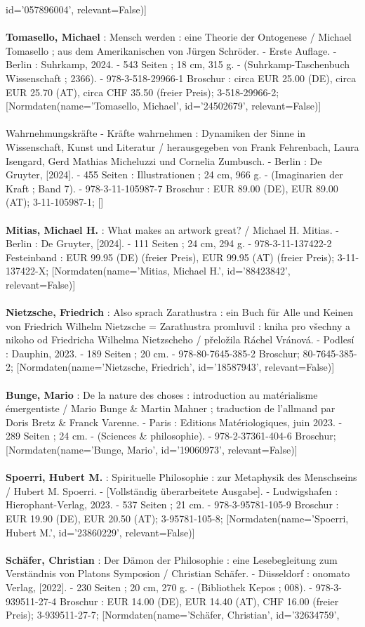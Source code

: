 \documentclass{article}
\begin{document}
\begin{multicols}{3}
id='057896004', relevant=False)]\\\\\textbf{Tomasello, Michael} : Mensch werden : eine Theorie der Ontogenese / Michael Tomasello ; aus dem Amerikanischen von Jürgen Schröder. - Erste Auflage. - Berlin : Suhrkamp, 2024. - 543 Seiten ; 18 cm, 315 g. - (Suhrkamp-Taschenbuch Wissenschaft ; 2366). - 978-3-518-29966-1 Broschur : circa EUR 25.00 (DE), circa EUR 25.70 (AT), circa CHF 35.50 (freier Preis); 3-518-29966-2; [Normdaten(name='Tomasello, Michael', id='24502679', relevant=False)]\\\\Wahrnehmungskräfte - Kräfte wahrnehmen : Dynamiken der Sinne in Wissenschaft, Kunst und Literatur / herausgegeben von Frank Fehrenbach, Laura Isengard, Gerd Mathias Micheluzzi und Cornelia Zumbusch. - Berlin : De Gruyter, [2024]. - 455 Seiten : Illustrationen ; 24 cm, 966 g. - (Imaginarien der Kraft ; Band 7). - 978-3-11-105987-7 Broschur : EUR 89.00 (DE), EUR 89.00 (AT); 3-11-105987-1; []\\\\\textbf{Mitias, Michael H.} : What makes an artwork great? / Michael H. Mitias. - Berlin : De Gruyter, [2024]. - 111 Seiten ; 24 cm, 294 g. - 978-3-11-137422-2 Festeinband : EUR 99.95 (DE) (freier Preis), EUR 99.95 (AT) (freier Preis); 3-11-137422-X; [Normdaten(name='Mitias, Michael H.', id='88423842', relevant=False)]\\\\\textbf{Nietzsche, Friedrich} : Also sprach Zarathustra : ein Buch für Alle und Keinen von Friedrich Wilhelm Nietzsche = Zarathustra promluvil : kniha pro všechny a nikoho od Friedricha Wilhelma Nietzscheho / přeložila Ráchel Vránová. - Podlesí : Dauphin, 2023. - 189 Seiten ; 20 cm. - 978-80-7645-385-2 Broschur; 80-7645-385-2; [Normdaten(name='Nietzsche, Friedrich', id='18587943', relevant=False)]\\\\\textbf{Bunge, Mario} : De la nature des choses : introduction au matérialisme émergentiste / Mario Bunge \& Martin Mahner ; traduction de l'allmand par Doris Bretz \& Franck Varenne. - Paris : Editions Matériologiques, juin 2023. - 289 Seiten ; 24 cm. - (Sciences \& philosophie). - 978-2-37361-404-6 Broschur; [Normdaten(name='Bunge, Mario', id='19060973', relevant=False)]\\\\\textbf{Spoerri, Hubert M.} : Spirituelle Philosophie : zur Metaphysik des Menschseins / Hubert M. Spoerri. - [Vollständig überarbeitete Ausgabe]. - Ludwigshafen : Hierophant-Verlag, 2023. - 537 Seiten ; 21 cm. - 978-3-95781-105-9 Broschur : EUR 19.90 (DE), EUR 20.50 (AT); 3-95781-105-8; [Normdaten(name='Spoerri, Hubert M.', id='23860229', relevant=False)]\\\\\textbf{Schäfer, Christian} : Der Dämon der Philosophie : eine Lesebegleitung zum Verständnis von Platons Symposion / Christian Schäfer. - Düsseldorf : onomato Verlag, [2022]. - 230 Seiten ; 20 cm, 270 g. - (Bibliothek Kepos ; 008). - 978-3-939511-27-4 Broschur : EUR 14.00 (DE), EUR 14.40 (AT), CHF 16.00 (freier Preis); 3-939511-27-7; [Normdaten(name='Schäfer, Christian', id='32634759', 
\end{multicols}
\end{document}
